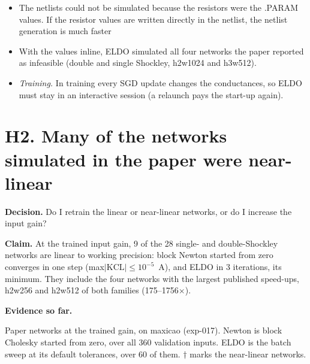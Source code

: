\documentclass[11pt,a4paper]{article}
\newcommand{\claim}[1]{\par\noindent\textbf{Claim.} #1\par}
\newcommand{\evidence}{\par\noindent\textbf{Evidence so far.}\par}
\newcommand{\decision}[1]{\par\noindent\textbf{Decision.} #1\par}
\begin{document}
\begin{itemize}
\item The netlists could not be simulated because the resistors were the .PARAM values. If the resistor values are written directly in the netlist, the netlist generation is much faster
\item With the values inline, ELDO simulated all four networks the
paper reported as infeasible (double and single Shockley, h2w1024 and
h3w512).
\end{itemize}

\begin{itemize}
\item \emph{Training.} In training every SGD update changes the
conductances, so ELDO must stay in an interactive session (a relaunch
pays the start-up again).
\end{itemize}

\section*{H2. Many of the networks simulated in the paper were near-linear}

\decision{Do I retrain the linear or near-linear networks, or do I increase the input gain?}

\claim{At the trained input gain, 9 of the 28 single- and double-Shockley
networks are linear to working precision: block Newton started from zero
converges in one step (max$|\mathrm{KCL}| \le 10^{-5}$~A), and ELDO in 3
iterations, its minimum. They include the four networks with the largest
published speed-ups, h2w256 and h2w512 of both families
(175--1756$\times$). }

\evidence
Paper networks at the trained gain, on maxicao (exp-017). Newton is block
Cholesky started from zero, over all 360 validation inputs. ELDO is the
batch sweep at its default tolerances, over 60 of them. $\dagger$ marks the
near-linear networks.
\end{document}
